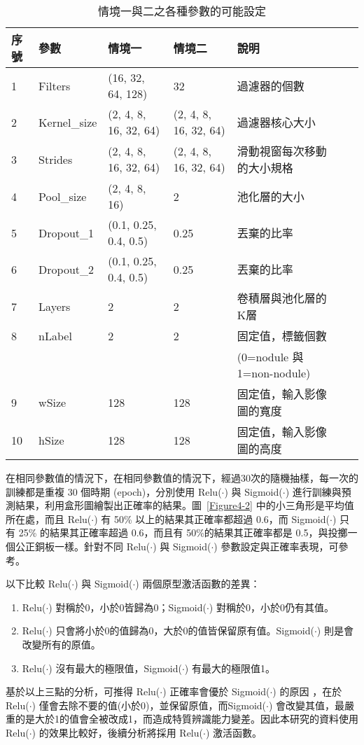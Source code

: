 \documentclass[12pt, a4paper]{article} 				%
\begin{document}
\begin{table}[!ht]
\begin{center}
\caption{情境一與二之各種參數的可能設定}\label{Table4-2}
\begin{tabular}{lllllll}\toprule
序號	&	參數	&	情境一	&	情境二	&	說明	\\\midrule
1	&	Filters	&	(16, 32, 64, 128)	&	32	&	過濾器的個數	\\
2	&	Kernel\_size	&	(2, 4, 8, 16, 32, 64)	&	(2, 4, 8, 16, 32, 64)	&	過濾器核心大小	\\
3	&	Strides	&	(2, 4, 8, 16, 32, 64)	&	(2, 4, 8, 16, 32, 64)	&	滑動視窗每次移動的大小規格	\\
4	&	Pool\_size	&	(2, 4, 8, 16)	&	2	&	池化層的大小	\\
5	&	Dropout\_1	&	(0.1, 0.25, 0.4, 0.5)	&	0.25	&	丟棄的比率	\\
6	&	Dropout\_2	&	(0.1, 0.25, 0.4, 0.5)	&	0.25	&	丟棄的比率	\\
7	&	Layers	&	2	&	2	&	卷積層與池化層的K層	\\
8	&	nLabel	&	2	&	2	&	固定值，標籤個數	 \\
   &              &      &    & (0=nodule  與 1=non-nodule)\\
9	&	wSize	&	128	&	128	&	固定值，輸入影像圖的寬度	\\
10	&	hSize	&	128	&	128	&	固定值，輸入影像圖的高度	\\\bottomrule
\end{tabular}
\end{center}
\end{table}

在相同參數值的情況下，在相同參數值的情況下，經過30次的隨機抽樣，每一次的訓練都是重複 30 個時期 (epoch)，分別使用 Relu($\cdot$) 與 Sigmoid($\cdot$)  進行訓練與預測結果，利用盒形圖繪製出正確率的結果。圖~\ref{Figure4-2} 中的小三角形是平均值所在處，而且 Relu($\cdot$) 有 50\% 以上的結果其正確率都超過 0.6，而 Sigmoid($\cdot$) 只有 25\% 的結果其正確率超過 0.6，而且有 50\%的結果其正確率都是 0.5，與投擲一個公正銅板一樣。針對不同 Relu($\cdot$) 與 Sigmoid($\cdot$) 參數設定與正確率表現，可參考\cite{Chen2018}。

以下比較 Relu($\cdot$) 與 Sigmoid($\cdot$) 兩個原型激活函數的差異：
\begin{enumerate}
\item Relu($\cdot$) 對稱於0，小於0皆歸為0；Sigmoid($\cdot$) 對稱於0，小於0仍有其值。
\item Relu($\cdot$) 只會將小於0的值歸為0，大於0的值皆保留原有值。Sigmoid($\cdot$) 則是會改變所有的原值。
\item Relu($\cdot$) 沒有最大的極限值，Sigmoid($\cdot$) 有最大的極限值1。
\end{enumerate}
基於以上三點的分析，可推得 Relu($\cdot$) 正確率會優於 Sigmoid($\cdot$) 的原因 \cite{Fox2016BreastMC,Shaima2016}，在於 Relu($\cdot$) 僅會去除不要的值(小於0)，並保留原值，而Sigmoid($\cdot$) 會改變其值，最嚴重的是大於1的值會全被改成1，而造成特質辨識能力變差。因此本研究的資料使用 Relu($\cdot$) 的效果比較好，後續分析將採用 Relu($\cdot$) 激活函數。
\end{document}
